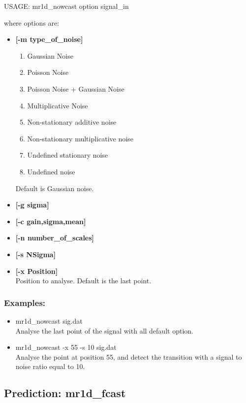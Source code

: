 {\bf
\begin{center}
 USAGE: mr1d\_nowcast option signal\_in  
\end{center}}
where options are:
\begin{itemize}
\item {\bf [-m type\_of\_noise]}
{\small
\begin{enumerate}
\baselineskip=0.4truecm
\item Gaussian Noise 
\item Poisson Noise 
\item Poisson Noise + Gaussian Noise 
\item Multiplicative Noise 
\item Non-stationary additive noise 
\item Non-stationary multiplicative noise 
\item Undefined stationary noise 
\item Undefined noise 
\end{enumerate}
}
 Default is Gaussian noise.
\item {\bf [-g sigma]} 
\item {\bf [-c gain,sigma,mean]} 
\item {\bf [-n number\_of\_scales]} 
\item {\bf [-s NSigma]} 
\item {\bf [-x Position]}  \\
Position to analyse. Default is the last point.
\end{itemize}
\subsubsection*{Examples:}
\begin{itemize}
\item mr1d\_nowcast sig.dat  \\
Analyse the last point of the signal with all default option.
\item mr1d\_nowcast -x 55 -s 10 sig.dat  \\
Analyse the point at position 55, and detect the transition with a 
signal to noise ratio equal to 10.
\end{itemize}


\subsection{Prediction: mr1d\_fcast}

